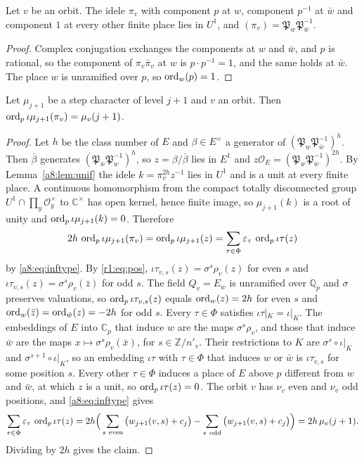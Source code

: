 \begin{lemma}\label{a8:lem:unif}
Let $v$ be an orbit. The idele $\pi_v$ with component $p$ at $w$, component $p^{-1}$ at $\bar w$ and component $1$ at every other finite place lies in $U^1$, and $(\pi_v)=\mathfrak P_w\mathfrak P_{\bar w}^{-1}$.
\end{lemma}

\begin{proof}
Complex conjugation exchanges the components at $w$ and $\bar w$, and $p$ is rational, so the component of $\pi_v\bar\pi_v$ at $w$ is $p\cdot p^{-1}=1$, and the same holds at $\bar w$. The place $w$ is unramified over $p$, so $\operatorname{ord}_w(p)=1$.
\end{proof}

\begin{lemma}\label{a8:lem:valmu}
Let $\mu_{j+1}$ be a step character of level $j+1$ and $v$ an orbit. Then $\operatorname{ord}_p\iota\mu_{j+1}(\pi_v)=\mu_v(j+1)$.
\end{lemma}

\begin{proof}
Let $h$ be the class number of $E$ and $\beta\in E^\times$ a generator of $(\mathfrak P_w\mathfrak P_{\bar w}^{-1})^h$. Then $\bar\beta$ generates $(\mathfrak P_{\bar w}\mathfrak P_w^{-1})^h$, so $z=\beta/\bar\beta$ lies in $E^1$ and $z\mathcal O_E=(\mathfrak P_w\mathfrak P_{\bar w}^{-1})^{2h}$. By Lemma~\ref{a8:lem:unif} the idele $k=\pi_v^{2h}z^{-1}$ lies in $U^1$ and is a unit at every finite place. A continuous homomorphism from the compact totally disconnected group $U^1\cap\prod_y\mathcal O_y^\times$ to $\mathbb C^\times$ has open kernel, hence finite image, so $\mu_{j+1}(k)$ is a root of unity and $\operatorname{ord}_p\iota\mu_{j+1}(k)=0$. Therefore
\[
2h\,\operatorname{ord}_p\iota\mu_{j+1}(\pi_v)=\operatorname{ord}_p\iota\mu_{j+1}(z)=\sum_{\tau\in\Phi}\varepsilon_\tau\,\operatorname{ord}_p\iota\tau(z)
\]
by \eqref{a8:eq:inftype}. By \eqref{r1:eq:pos}, $\iota\tau_{v,s}(z)=\sigma^s\rho_v(z)$ for even $s$ and $\iota\tau_{v,s}(z)=\sigma^s\rho_v(\bar z)$ for odd $s$. The field $Q_v=E_w$ is unramified over $\mathbb Q_p$ and $\sigma$ preserves valuations, so $\operatorname{ord}_p\iota\tau_{v,s}(z)$ equals $\operatorname{ord}_w(z)=2h$ for even $s$ and $\operatorname{ord}_w(\bar z)=\operatorname{ord}_{\bar w}(z)=-2h$ for odd $s$. Every $\tau\in\Phi$ satisfies $\iota\tau|_K=\iota|_K$. The embeddings of $E$ into $\mathbb C_p$ that induce $w$ are the maps $\sigma^s\rho_v$, and those that induce $\bar w$ are the maps $x\mapsto\sigma^s\rho_v(\bar x)$, for $s\in\mathbb Z/n'_v$. Their restrictions to $K$ are $\sigma^s\circ\iota|_K$ and $\sigma^{s+1}\circ\iota|_K$, so an embedding $\iota\tau$ with $\tau\in\Phi$ that induces $w$ or $\bar w$ is $\iota\tau_{v,s}$ for some position $s$. Every other $\tau\in\Phi$ induces a place of $E$ above $p$ different from $w$ and $\bar w$, at which $z$ is a unit, so $\operatorname{ord}_p\iota\tau(z)=0$. The orbit $v$ has $\nu_v$ even and $\nu_v$ odd positions, and \eqref{a8:eq:inftype} gives
\[
\sum_{\tau\in\Phi}\varepsilon_\tau\,\ord_p\iota\tau(z)=2h\Big(\sum_{s\ \mathrm{even}}\big(w_{j+1}(v,s)+c_j\big)-\sum_{s\ \mathrm{odd}}\big(w_{j+1}(v,s)+c_j\big)\Big)=2h\,\mu_v(j+1).
\]
Dividing by $2h$ gives the claim.
\end{proof}

